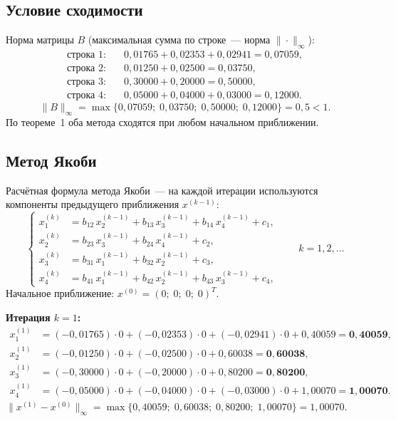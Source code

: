 \documentclass[a4paper, final]{article}
\begin{document}
\subsection{Условие сходимости}

Норма матрицы $B$ (максимальная сумма по строке~--- норма $\|\cdot\|_\infty$):
\begin{align*}
\text{строка 1:}&\quad 0{,}01765+0{,}02353+0{,}02941 = 0{,}07059,\\
\text{строка 2:}&\quad 0{,}01250+0{,}02500           = 0{,}03750,\\
\text{строка 3:}&\quad 0{,}30000+0{,}20000           = 0{,}50000,\\
\text{строка 4:}&\quad 0{,}05000+0{,}04000+0{,}03000 = 0{,}12000.
\end{align*}
\[
\|B\|_\infty = \max\{0{,}07059;\;0{,}03750;\;0{,}50000;\;0{,}12000\} = 0{,}5 < 1.
\]
По теореме~1 оба метода сходятся при любом начальном приближении.

\newpage

\subsection{Метод Якоби}

Расчётная формула метода Якоби~--- на каждой итерации используются
компоненты предыдущего приближения $x^{(k-1)}$:
\[
\left\{
\begin{aligned}
x_1^{(k)} &= b_{12}\,x_2^{(k-1)} + b_{13}\,x_3^{(k-1)} + b_{14}\,x_4^{(k-1)} + c_1,\\
x_2^{(k)} &= b_{23}\,x_3^{(k-1)} + b_{24}\,x_4^{(k-1)} + c_2,\\
x_3^{(k)} &= b_{31}\,x_1^{(k-1)} + b_{32}\,x_2^{(k-1)} + c_3,\\
x_4^{(k)} &= b_{41}\,x_1^{(k-1)} + b_{42}\,x_2^{(k-1)} + b_{43}\,x_3^{(k-1)} + c_4,
\end{aligned}
\right.\qquad k=1,2,\ldots
\]
Начальное приближение: $x^{(0)} = (0;\;0;\;0;\;0)^T$.

\medskip\textbf{Итерация $k=1$:}
\begin{align*}
x_1^{(1)} &= (-0{,}01765)\cdot0 + (-0{,}02353)\cdot0 + (-0{,}02941)\cdot0 + 0{,}40059 = \mathbf{0{,}40059},\\
x_2^{(1)} &= (-0{,}01250)\cdot0 + (-0{,}02500)\cdot0 + 0{,}60038 = \mathbf{0{,}60038},\\
x_3^{(1)} &= (-0{,}30000)\cdot0 + (-0{,}20000)\cdot0 + 0{,}80200 = \mathbf{0{,}80200},\\
x_4^{(1)} &= (-0{,}05000)\cdot0 + (-0{,}04000)\cdot0 + (-0{,}03000)\cdot0 + 1{,}00070 = \mathbf{1{,}00070}.
\end{align*}
$\|x^{(1)}-x^{(0)}\|_\infty = \max\{0{,}40059;\;0{,}60038;\;0{,}80200;\;1{,}00070\} = 1{,}00070.$
\end{document}

